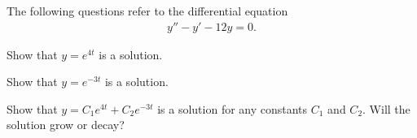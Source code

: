 

\begin{problem}
\item The following questions refer to the  differential
  equation
  \begin{eqnarray}
    y'' - y' - 12y = 0.
  \end{eqnarray}

  \begin{subproblem}
  \item Show that $y=e^{4t}$ is a solution.
    \vspace{4cm}
  \item Show that $y=e^{-3t}$ is a solution.
    \vspace{4cm}
  \item Show that $y=C_1 e^{4t} + C_2 e^{-3t}$ is a solution for
    any constants $C_1$ and $C_2$. Will the solution grow or
    decay?

    \vfill

  \end{subproblem}

\end{problem}


